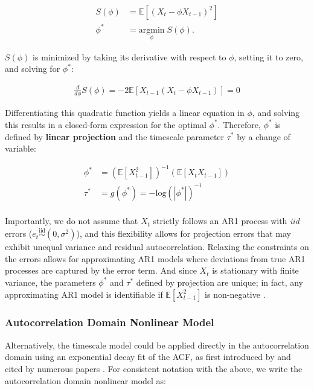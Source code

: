 \documentclass[main.tex]{subfiles}
\begin{document}
\begin{align}
    S(\phi) &= \mathbb{E}[(X_t - \phi X_{t-1})^2]\\
    \phi^* &= \underset{\phi}{\text{argmin}} \; S(\phi).
\end{align}

\noindent $S(\phi)$ is minimized by taking its derivative with respect to $\phi$, setting it to zero, and solving for $\phi^*$:

\begin{align}
    \frac{d}{d\phi} S(\phi) = -2 \mathbb{E}[X_{t-1}(X_t - \phi X_{t-1})] = 0
\end{align}

\noindent Differentiating this quadratic function yields a linear equation in $\phi$, and solving this results in a closed-form expression for the optimal $\phi^*$. Therefore, $\phi^*$ is defined by \textbf{linear projection} and the timescale parameter $\tau^*$ by a change of variable:

\begin{align}
    \phi^* &= (\mathbb{E}[X_{t-1}^2])^{-1}(\mathbb{E}[X_t X_{t-1}]) \label{eq:ar1-phi}\\
    \tau^* &= g(\phi^*) = -{\text{log}(|\phi^*|)}^{-1} \label{eq:ar1-tau}
\end{align}
\\

Importantly, we do not assume that $X_t$ strictly follows an AR1 process with \textit{iid} errors ($e_t \overset{\text{iid}}{\sim} (0, \sigma^2)$), and this flexibility allows for projection errors that may exhibit unequal variance and residual autocorrelation. Relaxing the constraints on the errors allows for approximating AR1 models where deviations from true AR1 processes are captured by the error term. And since $X_t$ is stationary with finite variance, the parameters $\phi^*$ and $\tau^*$ defined by projection are unique; in fact, any approximating AR1 model is identifiable if $\mathbb{E}[X_{t-1}^2]$ is non-negative \citep[theorem~14.28]{hansen_econometrics_2022}.\\

\subsubsection{Autocorrelation Domain Nonlinear Model}\label{sec:autocorrelation-domain-nonlinear-model}

Alternatively, the timescale model could be applied directly in the autocorrelation domain using an exponential decay fit of the ACF, as first introduced by \citet{murray_hierarchy_2014} and cited by numerous papers \citep{rossi-pool_invariant_2021, cirillo_neural_2018, ito_cortical_2020, runyan_distinct_2017, zeraati_flexible_2022, nougaret_intrinsic_2021, wasmuht_intrinsic_2018, muller_core_2020, maisson_choice-relevant_2021, li_hierarchical_2022, shafiei_topographic_2020}. For consistent notation with the  above, we write the autocorrelation domain nonlinear model as:
\end{document}
